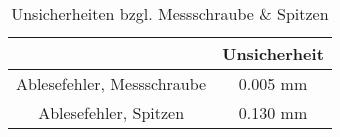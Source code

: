 \begin{table}[H]
    \centering
	\caption{Unsicherheiten bzgl. Messschraube \& Spitzen}
	\begin{tabular}{|c|c|}
		\hline
		& Unsicherheit \\
		\hline
		Ablesefehler, Messschraube & 0.005 mm \\
		\hline
		Ablesefehler, Spitzen & 0.130 mm \\
		\hline
	\end{tabular}
	\label{tab: u_M und u_S}
\end{table}